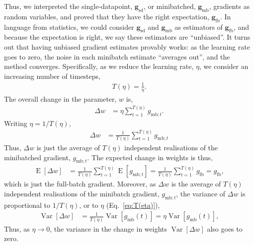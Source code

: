 \documentclass{article}
\newcommand{\bracket}[3]{\left#1 #3 \right#2}
\newcommand{\sqb}{\bracket{[}{]}}
\newcommand{\0}{\mathbf{0}}
\newcommand{\g}{\mathbf{g}}
\newcommand{\gfb}{\g_\text{fb}}
\newcommand{\gmb}{\g_\text{mb}}
\newcommand{\gsmbt}{g_{\text{mb}; t}}
\newcommand{\gsfb}{g_\text{fb}}
\newcommand{\gsmb}{g_\text{mb}}
\newcommand{\gsd}{\g_\text{sd}}
\newcommand{\E}{\operatorname{E}\sqb}
\newcommand{\Var}{\operatorname{Var}\sqb}
\begin{document}
Thus, we interpreted the single-datapoint, $\gsd$, or minibatched, $\gmb$, gradients as random variables, and proved that they have the right expectation, $\gfb$.
In language from statistics, we could consider $\gsd$ and $\gmb$ as estimators of $\gfb$, and because the expectation is right, we say these estimators are ``unbiased''.
It turns out that having unbiased gradient estimates provably works: as the learning rate goes to zero, the noise in each minibatch estimate ``averages out'', and the method converges.
Specifically, as we reduce the learning rate, $\eta$, we consider an increasing number of timesteps,
\begin{align}
  \label{eq:T(eta)}  
  T(\eta) = \tfrac{1}{\eta}.
\end{align}
The overall change in the parameter, $w$ is,
\begin{align}
  \Delta w &= \eta \sum_{t=1}^{T(\eta)} \gsmbt.
\end{align}
Writing $\eta = 1/T(\eta)$,
\begin{align}
  \Delta w &= \frac{1}{T(\eta)} \sum_{t=1}^{T(\eta)} \gsmbt
\end{align}
Thus, $\Delta w$ is just the average of $T(\eta)$ independent realisations of the minibatched gradient, $\gsmbt$.
The expected change in weights is thus,
\begin{align}
  \E{\Delta w} &= \frac{1}{T(\eta)} \sum_{t=1}^{T(\eta)} \E{\gsmbt} = \frac{1}{T(\eta)} \sum_{t=1}^{T(\eta)} \gsfb = \gsfb,
\end{align}
which is just the full-batch gradient.
Moreover, as $\Delta w$ is the average of $T(\eta)$ independent realisations of the minibatch gradient, $\gsmbt$, the variance of $\Delta w$ is proportional to $1/T(\eta)$, or to $\eta$ (Eq.~\ref{eq:T(eta)}),
\begin{align}
  \Var{\Delta w} &= \tfrac{1}{T(\eta)} \Var{\gsmb(t)} = \eta \Var{\gsmb(t)},
\end{align}
Thus, as $\eta \rightarrow 0$, the variance in the change in weights $\Var{\Delta w}$ also goes to zero.
%
\end{document}
